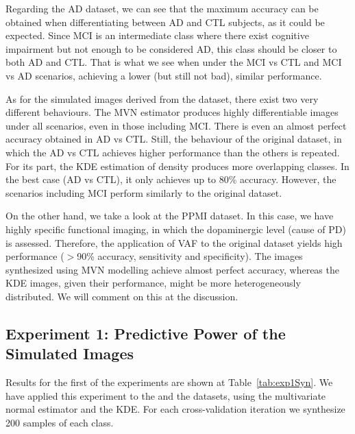 Regarding the \ac{AD} dataset, we can see that the maximum accuracy can be obtained when differentiating between \ac{AD} and \ac{CTL} subjects, as it could be expected. Since \ac{MCI} is an intermediate class where there exist cognitive impairment but not enough to be considered \ac{AD}, this class should be closer to both \ac{AD} and \ac{CTL}. That is what we see when under the \ac{MCI} vs \ac{CTL} and \ac{MCI} vs \ac{AD} scenarios, achieving a lower (but still not bad), similar performance.  %

As for the simulated images derived from the \adnipet{} dataset, there exist two very different behaviours. The \ac{MVN} estimator produces highly differentiable images under all scenarios, even in those including \ac{MCI}. There is even an almost perfect accuracy obtained in \ac{AD} vs \ac{CTL}. Still, the behaviour of the original dataset, in which the \ac{AD} vs \ac{CTL} achieves higher performance than the others is repeated. For its part, the \ac{KDE} estimation of density produces more overlapping classes. In the best case (\ac{AD} vs \ac{CTL}), it only achieves up to 80\% accuracy. However, the scenarios including \ac{MCI} perform similarly to the original dataset. 

On the other hand, we take a look at the \ac{PPMI} dataset. In this case, we have highly specific functional imaging, in which the dopaminergic level (cause of \ac{PD}) is assessed. Therefore, the application of \acs{VAF} to the original dataset yields high performance ($>$90\% accuracy, sensitivity and specificity). The images synthesized using \ac{MVN} modelling achieve almost perfect accuracy, whereas the \ac{KDE} images, given their performance, might be more heterogeneously distributed. We will comment on this at the discussion.  

\subsection{Experiment 1: Predictive Power of the Simulated Images}
Results for the first of the experiments are shown at Table~\ref{tab:exp1Syn}. We have applied this experiment to the \adnipet{} and the \ppmidat{} datasets, using the multivariate normal estimator and the \ac{KDE}. For each cross-validation iteration we synthesize 200 samples of each class. 

